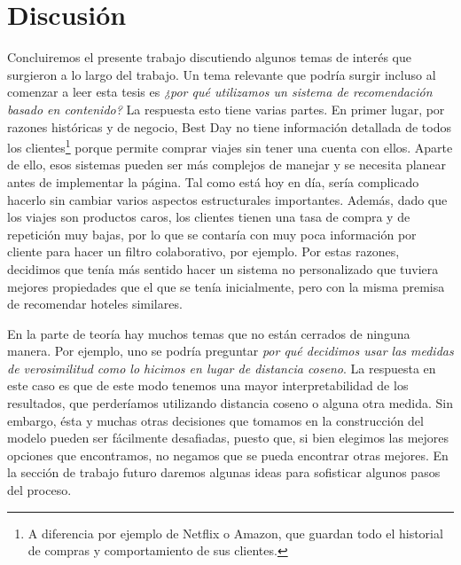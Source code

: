 \documentclass[12pt]{report}
\begin{document}

\clearpage
\section{Discusión}

Concluiremos el presente trabajo discutiendo algunos temas de interés que surgieron a lo largo del trabajo. Un tema relevante que podría surgir incluso al comenzar a leer esta tesis es \emph{¿por qué utilizamos un sistema de recomendación basado en contenido?} La respuesta esto tiene varias partes. En primer lugar, por razones históricas y de negocio, Best Day no tiene información detallada de todos los clientes\footnote{A diferencia por ejemplo de Netflix o Amazon, que guardan todo el historial de compras y comportamiento de sus clientes.} porque permite comprar viajes sin tener una cuenta con ellos. Aparte de ello, esos sistemas pueden ser más complejos de manejar y se necesita planear antes de implementar la página. Tal como está hoy en día, sería complicado hacerlo sin cambiar varios aspectos estructurales importantes. Además, dado que los viajes son productos caros, los clientes tienen una tasa de compra y de repetición muy bajas, por lo que se contaría con muy poca información por cliente para hacer un filtro colaborativo, por ejemplo. Por estas razones, decidimos que tenía más sentido hacer un sistema no personalizado que tuviera mejores propiedades que el que se tenía inicialmente, pero con la misma premisa de recomendar hoteles similares.

En la parte de teoría hay muchos temas que no están cerrados de ninguna manera. Por ejemplo, uno se podría preguntar \emph{por qué decidimos usar las medidas de verosimilitud como lo hicimos en lugar de distancia coseno}. La respuesta en este caso es que de este modo tenemos una mayor interpretabilidad de los resultados, que perderíamos utilizando distancia coseno o alguna otra medida. Sin embargo, ésta y muchas otras decisiones que tomamos en la construcción del modelo pueden ser fácilmente desafiadas, puesto que, si bien elegimos las mejores opciones que encontramos, no negamos que se pueda encontrar otras mejores. En la sección de trabajo futuro daremos algunas ideas para sofisticar algunos pasos del proceso.
\end{document}
